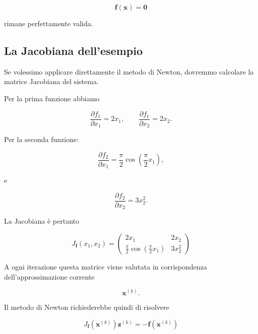 \begin{equation*}
    \mathbf{f}(\mathbf{x})=\mathbf{0}
\end{equation*}

rimane perfettamente valida.


\subsection{La Jacobiana dell'esempio}

Se volessimo applicare direttamente il metodo di Newton, dovremmo
calcolare la matrice Jacobiana del sistema.

Per la prima funzione abbiamo

\begin{equation*}
    \frac{\partial f_1}{\partial x_1}=2x_1,
    \qquad
    \frac{\partial f_1}{\partial x_2}=2x_2.
\end{equation*}

Per la seconda funzione:

\begin{equation*}
    \frac{\partial f_2}{\partial x_1}
    =
    \frac{\pi}{2}
    \cos\left(\frac{\pi}{2}x_1\right),
\end{equation*}

e

\begin{equation*}
    \frac{\partial f_2}{\partial x_2}
    =
    3x_2^2.
\end{equation*}

La Jacobiana è pertanto

\begin{equation*}
J_{\mathbf{f}}(x_1,x_2)
=
\begin{pmatrix}
2x_1 & 2x_2\\[2mm]
\displaystyle
\frac{\pi}{2}
\cos\left(\frac{\pi}{2}x_1\right)
&
3x_2^2
\end{pmatrix}
\label{eq:quarteroni-jacobian}
\end{equation*}

A ogni iterazione questa matrice viene valutata in corrispondenza
dell'approssimazione corrente

\begin{equation*}
    \mathbf{x}^{(k)}.
\end{equation*}

Il metodo di Newton richiederebbe quindi di risolvere

\begin{equation*}
    J_{\mathbf{f}}(\mathbf{x}^{(k)})
    \mathbf{z}^{(k)}
    =
    -\mathbf{f}(\mathbf{x}^{(k)})
\end{equation*}

